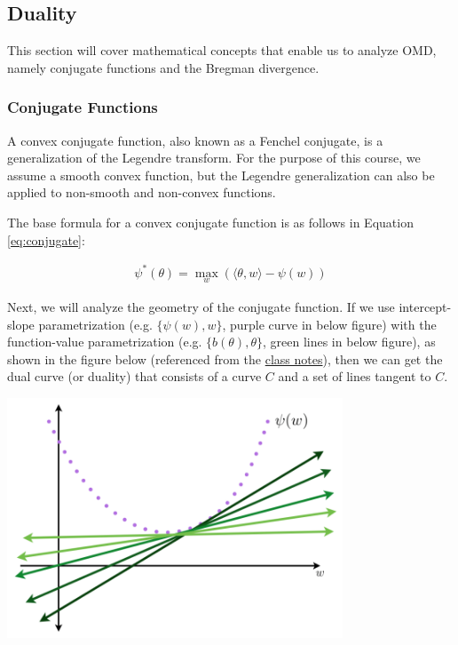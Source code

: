 \documentclass[11pt]{article}
\begin{document}

\subsection{Duality}

This section will cover mathematical concepts that enable us to analyze OMD, namely conjugate functions and the Bregman divergence.

\subsubsection{Conjugate Functions}

A convex conjugate function, also known as a Fenchel conjugate, is a generalization of the Legendre transform. For the purpose of this course, we assume a smooth convex function, but the Legendre generalization can also be applied to non-smooth and non-convex functions.

The base formula for a convex conjugate function is as follows in Equation \ref{eq:conjugate}:

\begin{align}
    \psi^*(\theta) = \max_w (\langle \theta, w \rangle - \psi(w)) \label{eq:conjugate}
\end{align}

Next, we will analyze the geometry of the conjugate function. If we use intercept-slope parametrization (e.g. $\{\psi(w), w\}$, purple curve in below figure) with the function-value parametrization (e.g. $\{b(\theta), \theta \}$, green lines in below figure), as shown in the figure below (referenced from the \href{https://www.dropbox.com/sh/j3cnwem4wo1u3bx/AADlFGyy7quBUsXrnQ3hda6La?dl=0&preview=L8+OMD-Duality.pdf}{class notes}), then we can get the dual curve (or duality) that consists of a curve $C$ and a set of lines tangent to $C$. 

\begin{center}
    \includegraphics[width=10cm]{duality.png}
\end{center}
\end{document}

